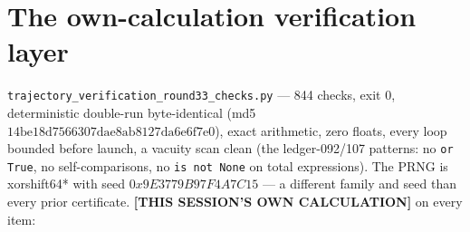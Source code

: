 \documentclass[11pt]{article}
\newcommand{\MINE}{\textbf{[THIS SESSION'S OWN CALCULATION]}}
\begin{document}
\section{The own-calculation verification layer}

\texttt{trajectory\_verification\_round33\_checks.py} --- 844 checks, exit 0,
deterministic double-run byte-identical (md5
$14\mathrm{be}18\mathrm{d}7566307\mathrm{dae}8\mathrm{ab}8127\mathrm{da}6\mathrm{e}6\mathrm{f}7\mathrm{e}0$),
exact arithmetic, zero floats, every loop bounded before launch, a vacuity
scan clean (the ledger-092/107 patterns: no \texttt{or True}, no
self-comparisons, no \texttt{is not None} on total expressions). The PRNG is
xorshift64* with seed $0x9E3779B97F4A7C15$ --- a different family and seed
than every prior certificate. \MINE{} on every item:
\end{document}
